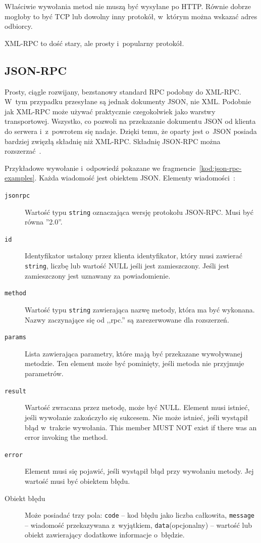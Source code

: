 Właściwie wywołania metod nie muszą być wysyłane po HTTP. Równie dobrze mogłoby to być TCP lub dowolny inny protokół, w~którym można wskazać adres odbiorcy.

XML-RPC to dość stary, ale prosty i~popularny protokół.



\subsection{JSON-RPC}
\label{json-rpc}
Prosty, ciągle rozwijany, bezstanowy standard RPC podobny do XML-RPC. W~tym przypadku przesyłane są jednak dokumenty JSON, nie XML.
Podobnie jak XML-RPC może używać praktycznie czegokolwiek jako warstwy transportowej.
Wszystko, co pozwoli na przekazanie dokumentu JSON od klienta do serwera i~z~powrotem się nadaje.
Dzięki temu, że oparty jest o~JSON posiada bardziej zwięzłą składnię niż XML-RPC.
Składnię JSON-RPC można rozszerzać~\cite{json-rpc-extensions}.

Przykładowe wywołanie i~odpowiedź pokazane we fragmencie~\ref{kod:json-rpc-examples}.
Każda wiadomość jest obiektem JSON.
Elementy wiadomości~\cite{json-rpc-specification}:
\begin{description}
	\item[\texttt{jsonrpc}] Wartość typu \texttt{string} oznaczająca wersję protokołu JSON-RPC. Musi być równa ''2.0''.
	\item[\texttt{id}] Identyfikator ustalony przez klienta identyfikator, który musi zawierać \texttt{string}, liczbę lub wartość NULL jeśli jest zamieszczony. Jeśli jest zamieszczony jest uznawany za powiadomienie.
	\item[\texttt{method}] Wartość typu \texttt{string} zawierająca nazwę metody, która ma być wykonana. Nazwy zaczynające się od ,,rpc.'' są zarezerwowane dla rozszerzeń.
	\item[\texttt{params}] Lista zawierająca parametry, które mają być przekazane wywoływanej metodzie. Ten element może być pominięty, jeśli metoda nie przyjmuje parametrów.
	\item[\texttt{result}] Wartość zwracana przez metodę, może być NULL. Element musi istnieć, jeśli wywołanie zakończyło się sukcesem. Nie może istnieć, jeśli wystąpił błąd w~trakcie wywołania.
This member MUST NOT exist if there was an error invoking the method.
	\item[\texttt{error}] Element musi się pojawić, jeśli wystąpił błąd przy wywołaniu metody. Jej wartość musi być obiektem błędu.
	\item[Obiekt błędu] Może posiadać trzy pola: \texttt{code} -- kod błędu jako liczba całkowita, \texttt{message} -- wiadomość przekazywana z~wyjątkiem, \texttt{data}(opcjonalny) -- wartość lub obiekt zawierający dodatkowe informacje o~błędzie.
\end{description}

